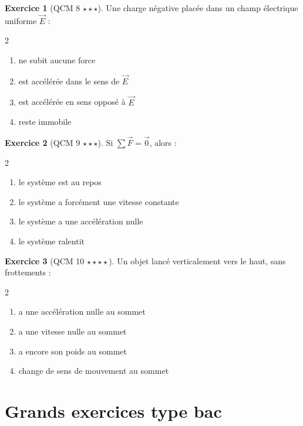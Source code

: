 \documentclass[11pt,a4paper]{article}
\theoremstyle{definition}
\newtheorem{exercice}{Exercice}[section]
\newcommand{\etoiles}[1]{\hfill{\small\textbf{#1}}}
\begin{document}
\begin{exercice}[QCM 8 \etoiles{$\star\star\star$}]
Une charge négative placée dans un champ électrique uniforme $\vec{E}$ :
\begin{multicols}{2}
\begin{enumerate}[label=\Alph*.]
    \item ne subit aucune force
    \item est accélérée dans le sens de $\vec{E}$
    \item est accélérée en sens opposé à $\vec{E}$
    \item reste immobile
\end{enumerate}
\end{multicols}
\end{exercice}

\begin{exercice}[QCM 9 \etoiles{$\star\star\star$}]
Si $\sum \vec{F}=\vec{0}$, alors :
\begin{multicols}{2}
\begin{enumerate}[label=\Alph*.]
    \item le système est au repos
    \item le système a forcément une vitesse constante
    \item le système a une accélération nulle
    \item le système ralentit
\end{enumerate}
\end{multicols}
\end{exercice}

\begin{exercice}[QCM 10 \etoiles{$\star\star\star\star$}]
Un objet lancé verticalement vers le haut, sans frottements :
\begin{multicols}{2}
\begin{enumerate}[label=\Alph*.]
    \item a une accélération nulle au sommet
    \item a une vitesse nulle au sommet
    \item a encore son poids au sommet
    \item change de sens de mouvement au sommet
\end{enumerate}
\end{multicols}
\end{exercice}

\section{Grands exercices type bac}
\end{document}
